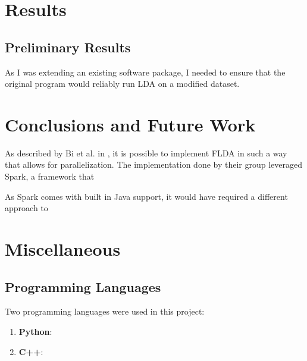 \documentclass[a4paper]{article}
\begin{document}
\begin{multicols}{2}
\section{Results}
\label{sec:results}
\subsection{Preliminary Results}
As I was extending an existing software package, I needed to ensure that the original program would reliably run LDA on a modified dataset.



\section{Conclusions and Future Work}
\label{sec:conc}

As described by Bi et al. in \cite{flda}, it is possible to implement FLDA in such a way that allows for parallelization. The implementation done by their group leveraged Spark, a framework that 



As Spark comes with built in Java support, it would have required a different approach to 

\section{Miscellaneous}
\label{sec:misc}
\subsection{Programming Languages}
Two programming languages were used in this project:
\begin{enumerate}
\item \textbf{Python}: 
\item \textbf{C++}: 
\end{enumerate}

\end{multicols}
\end{document}
